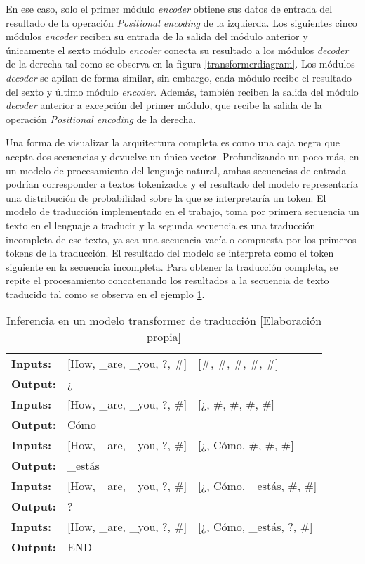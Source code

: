 En ese caso, solo el primer módulo \textit{encoder} obtiene sus datos de entrada del resultado de la operación \textit{Positional encoding} de la izquierda. Los siguientes cinco módulos \textit{encoder} reciben su entrada de la salida del módulo anterior y únicamente el sexto módulo \textit{encoder} conecta su resultado a los módulos \textit{decoder} de la derecha tal como se observa en la figura \ref{transformerdiagram}.
Los módulos \textit{decoder} se apilan de forma similar, sin embargo, cada módulo recibe el resultado del sexto y último módulo \textit{encoder}. Además, también reciben la salida del módulo \textit{decoder} anterior a excepción del primer módulo, que recibe la salida de la operación \textit{Positional encoding} de la derecha.

Una forma de visualizar la arquitectura completa es como una caja negra que acepta dos secuencias y devuelve un único vector. Profundizando un poco más, en un modelo de procesamiento del lenguaje natural, ambas secuencias de entrada podrían corresponder a textos tokenizados y el resultado del modelo representaría una distribución de probabilidad sobre la que se interpretaría un token. El modelo de traducción implementado en el trabajo, toma por primera secuencia un texto en el lenguaje a traducir y la segunda secuencia es una traducción incompleta de ese texto, ya sea una secuencia vacía o compuesta por los primeros tokens de la traducción. El resultado del modelo se interpreta como el token siguiente en la secuencia incompleta. Para obtener la traducción completa, se repite el procesamiento concatenando los resultados a la secuencia de texto traducido tal como se observa en el ejemplo \ref{transforminexample}.

\begin{table}[H]
    \begin{center}
        \begin{tabular}{ l l l }
        \hline
        \textbf{Inputs:} & [How, \_are, \_you, ?, \#] & [\#, \#, \#, \#, \#] \\ 
        \textbf{Output:} & ¿ \\  
        \hline
        \textbf{Inputs:} & [How, \_are, \_you, ?, \#] & [¿, \#, \#, \#, \#] \\ 
        \textbf{Output:} & Cómo \\  
        \hline
        \textbf{Inputs:} & [How, \_are, \_you, ?, \#] & [¿, Cómo, \#, \#, \#] \\ 
        \textbf{Output:} & \_estás \\  
        \hline
        \textbf{Inputs:} & [How, \_are, \_you, ?, \#] & [¿, Cómo, \_estás, \#, \#] \\ 
        \textbf{Output:} & ? \\  
        \hline
        \textbf{Inputs:} & [How, \_are, \_you, ?, \#] & [¿, Cómo, \_estás, ?, \#] \\ 
        \textbf{Output:} & END \\  
        \hline
        \end{tabular}
        \caption{Inferencia en un modelo transformer de traducción [Elaboración propia]}\label{transforminexample}
    \end{center}
\end{table}

